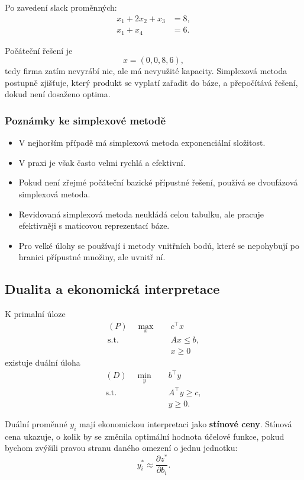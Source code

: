 Po zavedení slack proměnných:
\[
\begin{aligned}
x_1+2x_2+x_3&=8,\\
x_1+x_4&=6.
\end{aligned}
\]

Počáteční řešení je
\[
x=(0,0,8,6),
\]
tedy firma zatím nevyrábí nic, ale má nevyužité kapacity. Simplexová metoda postupně zjišťuje,
který produkt se vyplatí zařadit do báze, a přepočítává řešení, dokud není dosaženo optima.

\subsubsection{Poznámky ke simplexové metodě}

\begin{itemize}
    \item V nejhorším případě má simplexová metoda exponenciální složitost.
    \item V praxi je však často velmi rychlá a efektivní.
    \item Pokud není zřejmé počáteční bazické přípustné řešení, používá se dvoufázová simplexová metoda.
    \item Revidovaná simplexová metoda neukládá celou tabulku, ale pracuje efektivněji s maticovou reprezentací báze.
    \item Pro velké úlohy se používají i metody vnitřních bodů, které se nepohybují po hranici přípustné množiny,
    ale uvnitř ní.
\end{itemize}

\subsection{Dualita a ekonomická interpretace}

K primalní úloze
\[
\begin{aligned}
(P)\quad \max_x \quad & c^\top x\\
\text{s.t.}\quad & Ax\le b,\\
& x\ge 0
\end{aligned}
\]
existuje duální úloha
\[
\begin{aligned}
(D)\quad \min_y \quad & b^\top y\\
\text{s.t.}\quad & A^\top y\ge c,\\
& y\ge 0.
\end{aligned}
\]

Duální proměnné $y_i$ mají ekonomickou interpretaci jako \textbf{stínové ceny}. Stínová cena ukazuje,
o kolik by se změnila optimální hodnota účelové funkce, pokud bychom zvýšili pravou stranu daného
omezení o jednu jednotku:
\[
y_i^* \approx \frac{\partial z^*}{\partial b_i}.
\]

